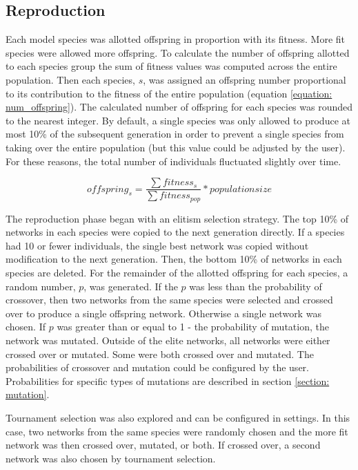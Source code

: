 \documentclass[12pt]{report}
\begin{document}
\subsection{Reproduction}
Each model species was allotted offspring in proportion with its fitness. More fit species were allowed more offspring. To calculate the number of offspring allotted to each species group the sum of fitness values was computed across the entire population. Then each species, $s$, was assigned an offspring number proportional to its contribution to the fitness of the entire population (equation \ref{equation: num_offspring}). The calculated number of offspring for each species was rounded to the nearest integer. By default, a single species was only allowed to produce at most 10\% of the subsequent generation in order to prevent a single species from taking over the entire population (but this value could be adjusted by the user). For these reasons, the total number of individuals fluctuated slightly over time.


\begin{equation}
\label{equation: num_offspring}
offspring_{s} = \frac{\sum{fitness_{s}}}{\sum{fitness_{pop}}}*populationsize
\end{equation} 

The reproduction phase began with an elitism selection strategy. The top 10\% of networks in each species were copied to the next generation directly. If a species had 10 or fewer individuals, the single best network was copied without modification to the next generation. Then, the bottom 10\% of networks in each species are deleted. For the remainder of the allotted offspring for each species, a random number, $p$, was generated. If the $p$ was less than the probability of crossover, then two networks from the same species were selected and crossed over to produce a single offspring network. Otherwise a single network was chosen. If $p$ was greater than or equal to 1 - the probability of mutation, the network was mutated. Outside of the elite networks, all networks were either crossed over or mutated. Some were both crossed over and mutated. The probabilities of crossover and mutation could be configured by the user. Probabilities for specific types of mutations are described in section \ref{section: mutation}.

Tournament selection was also explored and can be configured in settings. In this case, two networks from the same species were randomly chosen and the more fit network was then crossed over, mutated, or both. If crossed over, a second network was also chosen by tournament selection.
\end{document}
